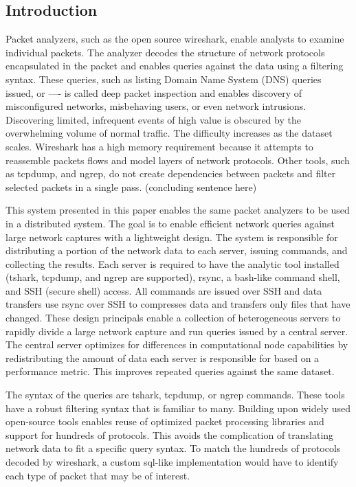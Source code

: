 \documentclass{article}
\begin{document}
\begin{multicols}{2}
  
\section{Introduction} %

Packet analyzers, such as the open source wireshark, enable analysts to examine individual packets.  The analyzer decodes the structure of network protocols encapsulated in the packet and enables queries against the data using a filtering syntax.  These queries, such as listing Domain Name System (DNS) queries issued, or —- is called deep packet inspection and enables discovery of misconfigured networks, misbehaving users, or even network intrusions. Discovering limited, infrequent events of high value is obscured by the overwhelming volume of normal traffic. The difficulty increases as the dataset scales.  Wireshark has a high memory requirement because it attempts to reassemble packets flows and model layers of network protocols.  Other tools, such as tcpdump, and ngrep, do not create dependencies between packets and filter selected packets in a single pass. (concluding sentence here)

This system presented in this paper enables the same packet analyzers to be used in a distributed system. The goal is to enable efficient network queries against large network captures with a lightweight design. The system is responsible for distributing a portion of the network data to each server, issuing commands, and collecting the results. Each server is required to have the analytic tool installed (tshark, tcpdump, and ngrep are supported), rsync, a bash-like command shell, and SSH (secure shell) access.  All commands are issued over SSH and data transfers use rsync over SSH to compresses data and transfers only files that have changed.  These design principals enable a collection of heterogeneous servers to rapidly divide a large network capture and run queries issued by a central server.  The central server optimizes for differences in computational node capabilities by redistributing the amount of data each server is responsible for based on a performance metric.  This improves repeated queries against the same dataset. 

The syntax of the queries are tshark, tcpdump, or ngrep commands.  These tools have a robust filtering syntax that is familiar to many.  Building upon widely used open-source tools enables reuse of optimized packet processing libraries and support for hundreds of protocols.  This avoids the complication of translating network data to fit a specific query syntax.  To match the hundreds of protocols decoded by wireshark, a custom sql-like implementation would have to identify each type of packet that may be of interest.


\end{multicols}
\end{document}
